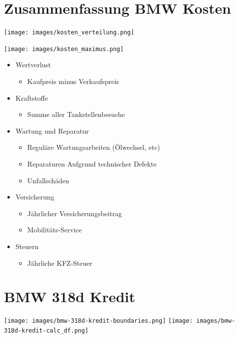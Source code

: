 \documentclass[landscape, DIV=99, 14pt]{scrartcl}
\begin{document}

\twocolumn
\section*{Zusammenfassung BMW Kosten}
\null
\vspace{1cm}
\begin{center}
\texttt{[image: images/kosten\_verteilung.png]}
\end{center}

\texttt{[image: images/kosten\_maximus.png]}

\pagebreak

\begin{itemize}
    \item Wertverlust
    \begin{itemize}
        \item Kaufpreis minus Verkaufspreis
    \end{itemize}
    \item Kraftstoffe
    \begin{itemize}
        \item Summe aller Tankstellenbesuche
    \end{itemize}
    \item Wartung und Reparatur
    \begin{itemize}
        \item Regul\"are Wartungsarbeiten (\"Olwechsel, etc)
        \item Reparaturen Aufgrund technischer Defekte
        \item Unfallsch\"aden
    \end{itemize}
    \item Versicherung
    \begin{itemize}
        \item J\"ahrlicher Versicherungsbeitrag
        \item Mobilit\"ats-Service
    \end{itemize}
    \item Steuern
    \begin{itemize}
            \item J\"ahrliche KFZ-Steuer
    \end{itemize}
\end{itemize}


\twocolumn

\section*{BMW 318d Kredit}
\begin{center}
\texttt{[image: images/bmw-318d-kredit-boundaries.png]}
\null
\vspace{0.5cm}
\texttt{[image: images/bmw-318d-kredit-calc\_df.png]}
\end{center}
\end{document}
